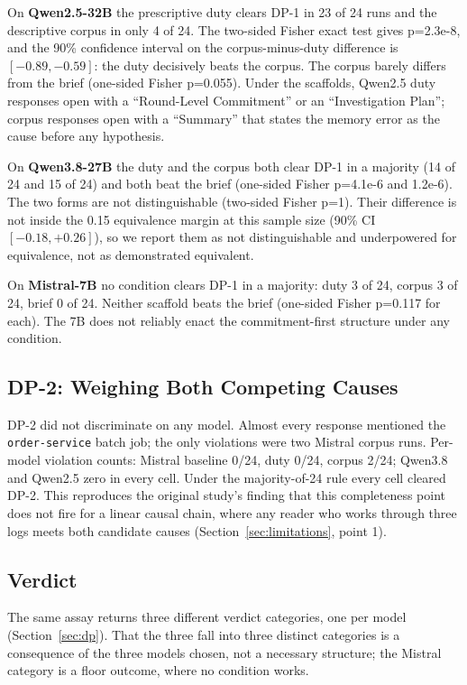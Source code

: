 \documentclass[11pt,a4paper]{article}
\begin{document}
On \textbf{Qwen2.5-32B} the prescriptive duty clears DP-1 in 23 of 24 runs and the
descriptive corpus in only 4 of 24. The two-sided Fisher exact test gives p=2.3e-8, and
the 90\% confidence interval on the corpus-minus-duty difference is $[-0.89, -0.59]$: the
duty decisively beats the corpus. The corpus barely differs from the brief (one-sided
Fisher p=0.055). Under the scaffolds, Qwen2.5 duty responses open with a
``Round-Level Commitment'' or an ``Investigation Plan''; corpus responses open with a
``Summary'' that states the memory error as the cause before any hypothesis.

On \textbf{Qwen3.8-27B} the duty and the corpus both clear DP-1 in a majority (14 of 24
and 15 of 24) and both beat the brief (one-sided Fisher p=4.1e-6 and 1.2e-6). The two
forms are not distinguishable (two-sided Fisher p=1). Their difference is not inside the
0.15 equivalence margin at this sample size (90\% CI $[-0.18, +0.26]$), so we report them
as not distinguishable and underpowered for equivalence, not as demonstrated equivalent.

On \textbf{Mistral-7B} no condition clears DP-1 in a majority: duty 3 of 24, corpus 3 of
24, brief 0 of 24. Neither scaffold beats the brief (one-sided Fisher p=0.117 for each).
The 7B does not reliably enact the commitment-first structure under any condition.

\subsection{DP-2: Weighing Both Competing Causes}\label{sec:dp2}

DP-2 did not discriminate on any model. Almost every response mentioned the
\texttt{order-service} batch job; the only violations were two Mistral corpus runs.
Per-model violation counts: Mistral baseline 0/24, duty 0/24, corpus 2/24; Qwen3.8 and
Qwen2.5 zero in every cell. Under the majority-of-24 rule every cell cleared DP-2. This
reproduces the original study's finding that this completeness point does not fire for a
linear causal chain, where any reader who works through three logs meets both candidate
causes (Section~\ref{sec:limitations}, point 1).

\subsection{Verdict}

The same assay returns three different verdict categories, one per model
(Section~\ref{sec:dp}). That the three fall into three distinct categories is a
consequence of the three models chosen, not a necessary structure; the Mistral category
is a floor outcome, where no condition works.
\end{document}
